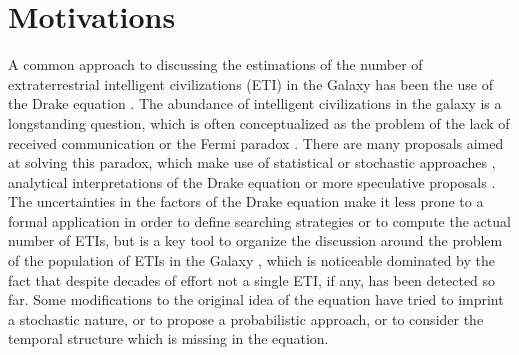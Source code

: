 \documentclass[crop]{CSLB}
\begin{document}
\maketitle



\section{Motivations}\label{S_motivations}

A common approach to discussing the estimations of the number of
extraterrestrial intelligent civilizations (ETI) in the Galaxy has
been the use of the Drake equation \citep{gleiser_drake_2010,
prantzos_joint_2013, haqq-misra_drake_2017}.
%
The abundance of intelligent civilizations in the galaxy is a
longstanding question, which is often conceptualized as the problem of
the lack of received communication or the Fermi paradox
\citep{barlow_galactic_2012, Sotos_biotechnology_2019,
forgan_galactic_2016}.
%
There are many proposals aimed at solving this paradox, which make use
of statistical \citep{solomonides_probabilistic_2016,
vanhouten_isthere_2017, horvat_calculating_2007,
maccone_statistical_2015} or stochastic approaches
\citep{forgan_numerical_2009, bloetscher_using_2019,
glade_stochastic_2011, forgan_numerical_2010}, analytical
interpretations of the Drake equation \citep{prantzos_joint_2013,
smith_broadcasting_2009} or more speculative proposals
\citep{barlow_galactic_2013, lampton_information_2013,
conway_three_2018, forgan_galactic_2017}.
%
The uncertainties in the factors of the Drake equation make it less
prone to a formal application in order to define searching strategies
or to compute the actual number of ETIs, but is a key tool to organize
the discussion around the problem of the population of ETIs in the
Galaxy \citep{hinkel_interdisciplinary_2019}, which is noticeable
dominated by the fact that despite decades of effort not a single ETI,
if any, has been detected so far.
%
Some modifications to the original idea of the equation have tried to
imprint a stochastic nature, or to propose a probabilistic approach,
or to consider the temporal structure which is missing in the
equation.
%


\Fpagebreak
\end{document}
